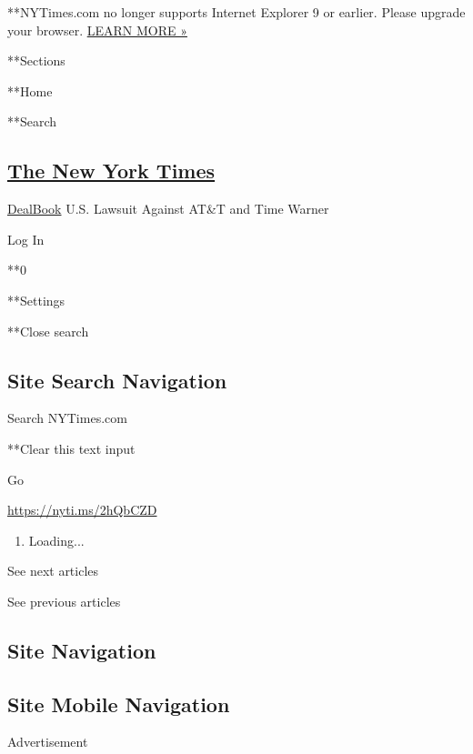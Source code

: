  **NYTimes.com no longer supports Internet Explorer 9 or earlier. Please
upgrade your browser.
\href{http://www.nytimes.com/content/help/site/ie9-support.html}{LEARN
MORE »}

**Sections

**Home

**Search

\hypertarget{the-new-york-times}{%
\subsection{\texorpdfstring{\href{http://www.nytimes.com/}{The New York
Times}}{The New York Times}}\label{the-new-york-times}}

 \href{/section/business/dealbook}{DealBook} \textbar{}U.S. Lawsuit
Against AT\&T and Time Warner

Log In

**0

**Settings

**Close search

\hypertarget{site-search-navigation}{%
\subsection{Site Search Navigation}\label{site-search-navigation}}

Search NYTimes.com

**Clear this text input

Go

\url{https://nyti.ms/2hQbCZD}

\begin{enumerate}
\def\labelenumi{\arabic{enumi}.}
\item
  Loading...
\end{enumerate}

See next articles

See previous articles

\hypertarget{site-navigation}{%
\subsection{Site Navigation}\label{site-navigation}}

\hypertarget{site-mobile-navigation}{%
\subsection{Site Mobile Navigation}\label{site-mobile-navigation}}

Advertisement

